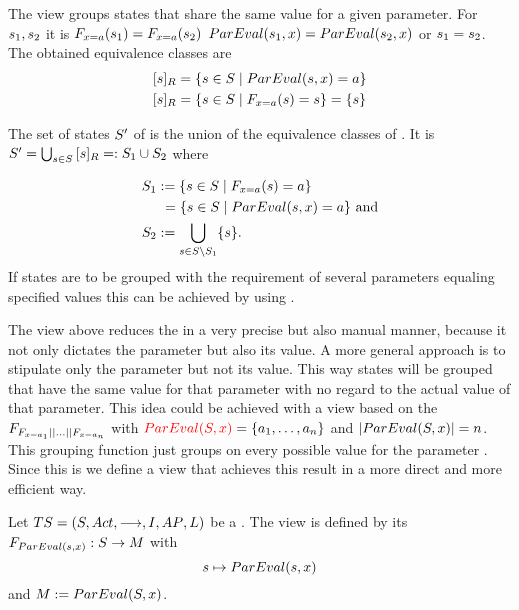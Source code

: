 \documentclass[preview]{standalone}
\begin{document}
The view \viewparamvalues groups states that share the same value for a given parameter. For ${s}_1, {s}_2$ it is ${{{F}}_{{x} = {a}}}({s}_1) = {{{F}}_{{x} = {a}}}({s}_2)$ \iffN ${ParEval}({s}_1, {x}) = {ParEval}({s}_2, {x})$ or ${s}_1 = {s}_2$. The obtained equivalence classes are
\begin{align*}
	\eqclassv{\state} &= \{\state \in \states \mid \parameval(\state, \param) = \paramval\} \\
	\eqclassv{\state} &= \{\state \in \states \mid \gfctparamvalues(\state) = \state\} = \{\state\}
\end{align*}

The set of states ${S}'$ of \viewparamvalues is the union of the equivalence classes of \eqrelview. It is ${S}' = \bigcup_{{s} \in {S}} {{[{s}]_{{R}}}} =: {S}_1 \cup {S}_2$ where

\begin{align*}
	\states_1 &:= \{\state \in \states \mid \gfctparamvalues(\state) = \paramval\} \\
	&\hspace{1.15mm}= \{\state \in \states  \mid \parameval(\state, \param) = \paramval\} \text{ and} \\
	\states_2 &:= \bigcup_{\state \in \states \setminus \states_1}\{\state\}.
\end{align*}
If states are to be grouped with the requirement of several parameters equaling specified values this can be achieved by using \parllcompN. 

The view above reduces the \chosengraphtypeN in a very precise but also manual manner, because it not only dictates the parameter but also its value. A more general approach is to stipulate only the parameter but not its value. This way states will be grouped that have the same value for that parameter with no regard to the actual value of that parameter. This idea could be achieved with a view based on the \grpfctN $\grpfct_{\gfctparamvaluesopt[\paramval_1] \pll \dots \pll \gfctparamvaluesopt[\paramval_n]}$ with ${\color{red}{ParEval}({S}, {x})} = \{{a}_1, \dots, {a}_n\}$ and $|{ParEval}({S},{x})| = n$. This grouping function just groups on every possible value for the parameter \param. Since this is  we define a view that achieves this result in a more direct and more efficient way.

\begin{definition}
	Let ${TS} = {({S}, {Act}, {\longrightarrow}, {I}, {AP}, {L})}$ be a \chosengraphtypeN. The view \viewparamvaleq is defined by its \grpfctN ${{{F}}_{{ParEval}({s},{x})}} : {S} \to {\ensuremath{{M}}}$ with
	\[
	{s} \mapsto {ParEval}({s},{x})
	\]
	and ${{M}} := {ParEval}({S}, {x})$.
\end{definition}
\end{document}
